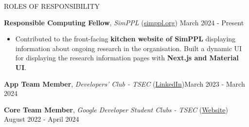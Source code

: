 \documentclass{resume} %
\begin{document}
\begin{rSection}{ROLES OF RESPONSIBILITY}

    \textbf{Responsible Computing Fellow}, \textit{SimPPL} (\href{https://simppl.org/}{simppl.org}) \hfill March 2024 - Present
    \begin{itemize}
        \item Contributed to the front-facing \textbf{kitchen website of SimPPL} displaying information about ongoing research in the organisation. Built a dynamic UI for displaying the research information pages with \textbf{Next.js and Material UI}.
    \end{itemize}

    \textbf{App Team Member}, \textit{Developers' Club - TSEC} (\href{https://www.linkedin.com/in/developer-s-club-tsec/}{LinkedIn})\hfill March 2023 - March 2024

    \textbf{Core Team Member}, \textit{Google Developer Student Clubs - TSEC} (\href{https://gdsc.community.dev/thadomal-shahani-engineering-college-mumbai/}{Website})  \hfill August 2022 - April 2024

\end{rSection}
\end{document}
